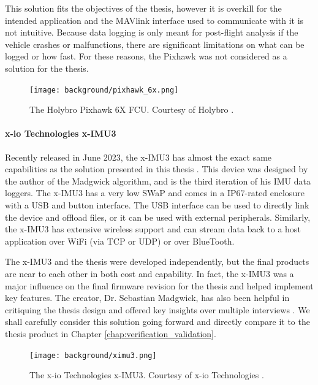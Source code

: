 This solution fits the objectives of the thesis, however it is overkill for the intended application and the MAVlink interface used to communicate with it is not intuitive.
Because data logging is only meant for post-flight analysis if the vehicle crashes or malfunctions, there are significant limitations on what can be logged or how fast.
For these reasons, the Pixhawk was not considered as a solution for the thesis.

\begin{figure}
    \centering
    \caption[Holybro Pixhawk 6X]{The Holybro Pixhawk 6X FCU.
    Courtesy of Holybro \cite{HolyBro}.}
    \texttt{[image: background/pixhawk\_6x.png]}
\end{figure}

\paragraph*{x-io Technologies x-IMU3} Recently released in June 2023, the x-IMU3 has almost the exact same capabilities as the solution presented in this thesis \cite{xioTechnologies}.
This device was designed by the author of the Madgwick algorithm, and is the third iteration of his IMU data loggers.
The x-IMU3 has a very low SWaP and comes in a IP67-rated enclosure with a USB and button interface.
The USB interface can be used to directly link the device and offload files, or it can be used with external peripherals.
Similarly, the x-IMU3 has extensive wireless support and can stream data back to a host application over WiFi (via TCP or UDP) or over BlueTooth.

The x-IMU3 and the thesis were developed independently, but the final products are near to each other in both cost and capability.
In fact, the x-IMU3 was a major influence on the final firmware revision for the thesis and helped implement key features.
The creator, Dr. Sebastian Madgwick, has also been helpful in critiquing the thesis design and offered key insights over multiple interviews \cite{Duffy:2023}.
We shall carefully consider this solution going forward and directly compare it to the thesis product in Chapter \ref{chap:verification_validation}.

\begin{figure}
    \centering
    \caption[x-io Technologies x-IMU3]{The x-io Technologies x-IMU3.
    Courtesy of x-io Technologies \cite{xioTechnologies}.}
    \texttt{[image: background/ximu3.png]}
\end{figure}